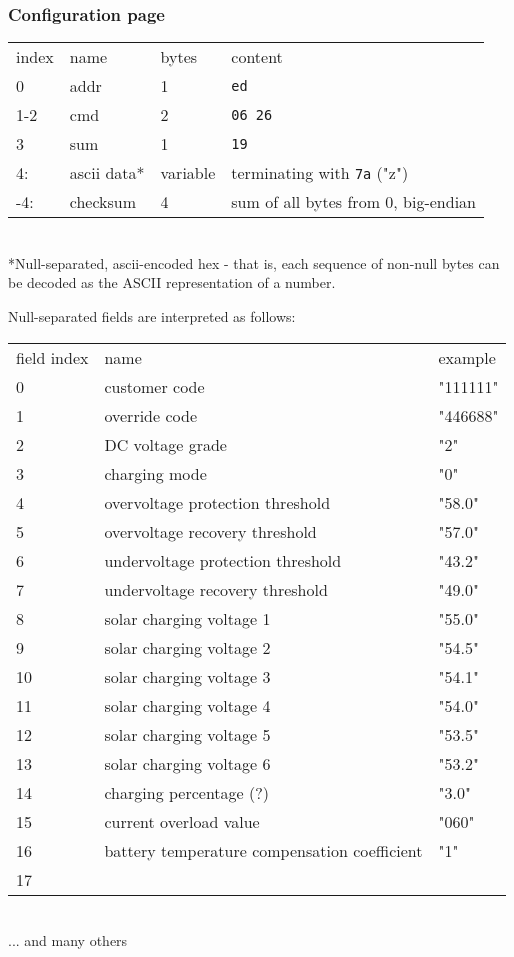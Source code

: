 \documentclass[pdftex,oneside,12pt,a4paper]{book}
\begin{document}
\subsubsection{Configuration page}
\noindent
\begin{tabular}{llll}
index & name & bytes & content\\
0 & addr & 1 & \verb|ed|\\
1-2 & cmd & 2 & \verb|06 26|\\
3 & sum & 1 & \verb|19|\\
4: & ascii data* & variable & terminating with \verb|7a| ("z")\\
-4: & checksum & 4 & sum of all bytes from 0, big-endian
\end{tabular}\\
{*}Null-separated, ascii-encoded hex - that is, each sequence of non-null bytes can be decoded as the ASCII representation of a number.

Null-separated fields are interpreted as follows:\\
\noindent
\begin{supertabular}{lll}
field index & name & example\\
0 & customer code & "111111"\\
1 & override code & "446688"\\
2 & DC voltage grade & "2"\\
3 & charging mode & "0" \\
4 & overvoltage protection threshold & "58.0" \\
5 & overvoltage recovery threshold & "57.0" \\ 
6 & undervoltage protection threshold & "43.2" \\
7 & undervoltage recovery threshold & "49.0" \\
8 & solar charging voltage 1 & "55.0" \\
9 & solar charging voltage 2 & "54.5" \\
10 & solar charging voltage 3 & "54.1" \\
11 & solar charging voltage 4 & "54.0" \\
12 & solar charging voltage 5 & "53.5" \\
13 & solar charging voltage 6 & "53.2" \\
14 & charging percentage (?) & "3.0" \\
15 & current overload value & "060" \\
16 & battery temperature compensation coefficient & "1" \\
17 & \\
\end{supertabular}\\
... and many others
\end{document}
